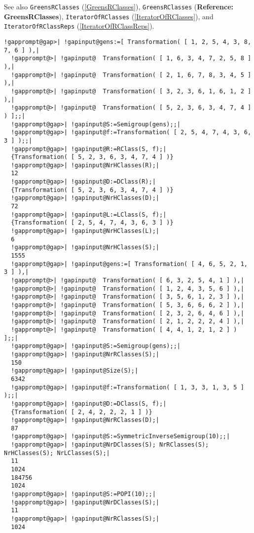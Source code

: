 \documentclass[a4paper,11pt]{report}
\begin{document}
{{{ See also \texttt{GreensRClasses} (\ref{GreensRClasses}), \texttt{GreensRClasses} (\textbf{Reference: GreensRClasses}), \texttt{IteratorOfRClasses} (\ref{IteratorOfRClasses}), and \texttt{IteratorOfRClassReps} (\ref{IteratorOfRClassReps}). 
\begin{Verbatim}[commandchars=!@|,fontsize=\small,frame=single,label=Example]
  !gapprompt@gap>| !gapinput@gens:=[ Transformation( [ 1, 2, 5, 4, 3, 8, 7, 6 ] ),|
  !gapprompt@>| !gapinput@  Transformation( [ 1, 6, 3, 4, 7, 2, 5, 8 ] ),|
  !gapprompt@>| !gapinput@  Transformation( [ 2, 1, 6, 7, 8, 3, 4, 5 ] ),|
  !gapprompt@>| !gapinput@  Transformation( [ 3, 2, 3, 6, 1, 6, 1, 2 ] ),|
  !gapprompt@>| !gapinput@  Transformation( [ 5, 2, 3, 6, 3, 4, 7, 4 ] ) ];;|
  !gapprompt@gap>| !gapinput@S:=Semigroup(gens);;|
  !gapprompt@gap>| !gapinput@f:=Transformation( [ 2, 5, 4, 7, 4, 3, 6, 3 ] );;|
  !gapprompt@gap>| !gapinput@R:=RClass(S, f);|
  {Transformation( [ 5, 2, 3, 6, 3, 4, 7, 4 ] )}
  !gapprompt@gap>| !gapinput@NrHClasses(R);|
  12
  !gapprompt@gap>| !gapinput@D:=DClass(R);|
  {Transformation( [ 5, 2, 3, 6, 3, 4, 7, 4 ] )}
  !gapprompt@gap>| !gapinput@NrHClasses(D);|
  72
  !gapprompt@gap>| !gapinput@L:=LClass(S, f);|
  {Transformation( [ 2, 5, 4, 7, 4, 3, 6, 3 ] )}
  !gapprompt@gap>| !gapinput@NrHClasses(L);|
  6
  !gapprompt@gap>| !gapinput@NrHClasses(S);|
  1555
  !gapprompt@gap>| !gapinput@gens:=[ Transformation( [ 4, 6, 5, 2, 1, 3 ] ),|
  !gapprompt@>| !gapinput@  Transformation( [ 6, 3, 2, 5, 4, 1 ] ),|
  !gapprompt@>| !gapinput@  Transformation( [ 1, 2, 4, 3, 5, 6 ] ),|
  !gapprompt@>| !gapinput@  Transformation( [ 3, 5, 6, 1, 2, 3 ] ),|
  !gapprompt@>| !gapinput@  Transformation( [ 5, 3, 6, 6, 6, 2 ] ),|
  !gapprompt@>| !gapinput@  Transformation( [ 2, 3, 2, 6, 4, 6 ] ),|
  !gapprompt@>| !gapinput@  Transformation( [ 2, 1, 2, 2, 2, 4 ] ),|
  !gapprompt@>| !gapinput@  Transformation( [ 4, 4, 1, 2, 1, 2 ] ) ];;|
  !gapprompt@gap>| !gapinput@S:=Semigroup(gens);;|
  !gapprompt@gap>| !gapinput@NrRClasses(S);|
  150
  !gapprompt@gap>| !gapinput@Size(S);|
  6342
  !gapprompt@gap>| !gapinput@f:=Transformation( [ 1, 3, 3, 1, 3, 5 ] );;|
  !gapprompt@gap>| !gapinput@D:=DClass(S, f);|
  {Transformation( [ 2, 4, 2, 2, 2, 1 ] )}
  !gapprompt@gap>| !gapinput@NrRClasses(D);|
  87
  !gapprompt@gap>| !gapinput@S:=SymmetricInverseSemigroup(10);;|
  !gapprompt@gap>| !gapinput@NrDClasses(S); NrRClasses(S); NrHClasses(S); NrLClasses(S);|
  11
  1024
  184756
  1024
  !gapprompt@gap>| !gapinput@S:=POPI(10);;|
  !gapprompt@gap>| !gapinput@NrDClasses(S);|
  11
  !gapprompt@gap>| !gapinput@NrRClasses(S);|
  1024
\end{Verbatim}
 }

}}
\end{document}
